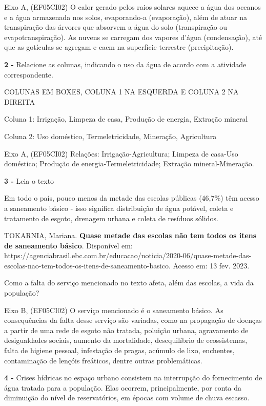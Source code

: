 Eixo A, (EF05CI02) O calor gerado pelos raios solares aquece a água dos
oceanos e a água armazenada nos solos, evaporando-a (evaporação), além
de atuar na transpiração das árvores que absorvem a água do solo
(transpiração ou evapotranspiração). As nuvens se carregam dos vapores
d'água (condensação), até que as gotículas se agregam e caem na
superfície terrestre (precipitação).

\textbf{2 -} Relacione as colunas, indicando o uso da água de acordo com
a atividade correspondente.

COLUNAS EM BOXES, COLUNA 1 NA ESQUERDA E COLUNA 2 NA DIREITA

Coluna 1: Irrigação, Limpeza de casa, Produção de energia, Extração
mineral

Coluna 2: Uso doméstico, Termeletricidade, Mineração, Agricultura

Eixo A, (EF05CI02) Relações: Irrigação-Agricultura; Limpeza de casa-Uso
doméstico; Produção de energia-Termeletricidade; Extração
mineral-Mineração.

\textbf{3 -} Leia o texto

Em todo o país, pouco menos da metade das escolas públicas (46,7\%) têm
acesso a saneamento básico - isso significa distribuição de água
potável, coleta e tratamento de esgoto, drenagem urbana e coleta de
resíduos sólidos.

TOKARNIA, Mariana. \textbf{Quase metade das escolas não tem todos os
itens de saneamento básico}. Disponível em:
https://agenciabrasil.ebc.com.br/educacao/noticia/2020-06/quase-metade-das-escolas-nao-tem-todos-os-itens-de-saneamento-basico.
Acesso em: 13 fev. 2023.

Como a falta do serviço mencionado no texto afeta, além das escolas, a
vida da população?

Eixo B, (EF05CI02) O serviço mencionado é o saneamento básico. As
consequências da falta desse serviço são variadas, como na propagação de
doenças a partir de uma rede de esgoto não tratada, poluição urbana,
agravamento de desigualdades sociais, aumento da mortalidade,
desequilíbrio de ecossistemas, falta de higiene pessoal, infestação de
pragas, acúmulo de lixo, enchentes, contaminação de lençóis freáticos,
dentre outras problemáticas.

\textbf{4 -} Crises hídricas no espaço urbano consistem na interrupção
do fornecimento de água tratada para a população. Elas ocorrem,
principalmente, por conta da diminuição do nível de reservatórios, em
épocas com volume de chuva escasso.


